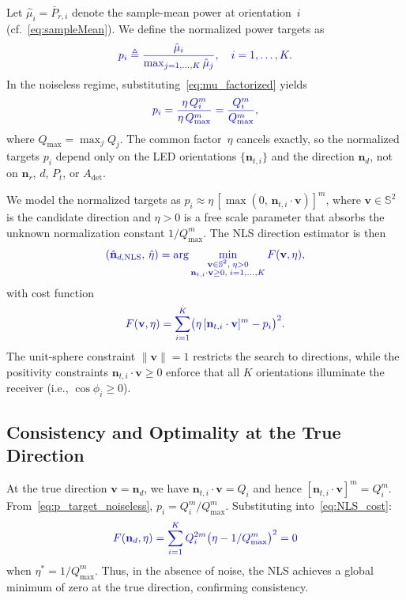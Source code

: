 \documentclass[journal]{IEEEtran}
\newcommand{\added}[1]{{\color{blue}#1}}
\begin{document}
\added{Let $\hat\mu_i = \bar P_{r,i}$ denote the sample-mean power at orientation~$i$ (cf.~\eqref{eq:sampleMean}). We define the normalized power targets as}
\begin{equation}
\added{p_i \triangleq \frac{\hat\mu_i}{\max_{j=1,\ldots,K}\hat\mu_j}, \quad i=1,\ldots,K.}
\label{eq:p_target}
\end{equation}
\added{In the noiseless regime, substituting~\eqref{eq:mu_factorized} yields}
\begin{equation}
\added{p_i = \frac{\eta\,Q_i^m}{\eta\,Q_{\max}^m} = \frac{Q_i^m}{Q_{\max}^m},}
\label{eq:p_target_noiseless}
\end{equation}
\added{where $Q_{\max}=\max_j Q_j$. The common factor~$\eta$ cancels exactly, so the normalized targets $p_i$ depend only on the LED orientations $\{\mathbf{n}_{t,i}\}$ and the direction $\mathbf{n}_d$, not on $\mathbf{n}_r$, $d$, $P_t$, or $A_{\mathrm{det}}$.}

\added{We model the normalized targets as $p_i \approx \eta\,[\max(0,\,\mathbf{n}_{t,i}\cdot\mathbf{v})]^m$, where $\mathbf{v}\in\mathbb{S}^2$ is the candidate direction and $\eta>0$ is a free scale parameter that absorbs the unknown normalization constant $1/Q_{\max}^m$. The NLS direction estimator is then}
\begin{equation}
\added{(\hat{\mathbf{n}}_{d,\mathrm{NLS}},\,\hat\eta) = \arg\min_{\substack{\mathbf{v}\in\mathbb{S}^2,\;\eta>0 \\ \mathbf{n}_{t,i}\cdot\mathbf{v}\ge0,\;i=1,\ldots,K}} F(\mathbf{v},\eta),}
\label{eq:argmin_NL}
\end{equation}
\added{with cost function}
\begin{equation}
\added{F(\mathbf{v},\eta) = \sum_{i=1}^{K}\bigl(\eta\,[\mathbf{n}_{t,i}\cdot\mathbf{v}]^m - p_i\bigr)^2.}
\label{eq:NLS_cost}
\end{equation}
\added{The unit-sphere constraint $\lVert\mathbf{v}\rVert=1$ restricts the search to directions, while the positivity constraints $\mathbf{n}_{t,i}\cdot\mathbf{v}\ge0$ enforce that all $K$ orientations illuminate the receiver (i.e., $\cos\phi_i\ge0$).}

\added{\subsection{Consistency and Optimality at the True Direction}}

\added{At the true direction $\mathbf{v}=\mathbf{n}_d$, we have $\mathbf{n}_{t,i}\cdot\mathbf{v}=Q_i$ and hence $[\mathbf{n}_{t,i}\cdot\mathbf{v}]^m=Q_i^m$. From~\eqref{eq:p_target_noiseless}, $p_i=Q_i^m/Q_{\max}^m$. Substituting into~\eqref{eq:NLS_cost}:}
\begin{equation}
\added{F(\mathbf{n}_d,\eta)=\sum_{i=1}^K Q_i^{2m}\bigl(\eta - 1/Q_{\max}^m\bigr)^2 = 0}
\end{equation}
\added{when $\eta^*=1/Q_{\max}^m$. Thus, in the absence of noise, the NLS achieves a global minimum of zero at the true direction, confirming consistency.}
\end{document}
